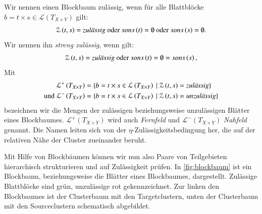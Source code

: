 \begin{defn}
	Wir nennen einen Blockbaum zulässig, wenn für alle Blattblöcke $b = t \times s \in \mathcal{L}\left(T_{X \times Y}\right)$ gilt:
	\begin{equation*}
	  \mathcal{Z}\left(t,s\right) = \text{\textit{zulässig}} \text{ oder }
	  sons\left(t\right) = \emptyset \text{ oder }
	  sons\left(s\right) = \emptyset.
	\end{equation*}      
	Wir nennen ihn \textit{streng zulässig}, wenn gilt:
	\begin{equation*}
	  \mathcal{Z}\left(t,s\right) = \text{\textit{zulässig}} \text{ oder }
	  sons\left(t\right) = \emptyset = sons\left(s\right),
	\end{equation*}
	Mit
	\begin{align*}
		      \mathcal{L}^+\left(T_{X \times Y}\right) &= \{ b = t \times s \in  \mathcal{L}\left(T_{X \times Y}\right) \ | \ \mathcal{Z}\left(t,s\right) = \ttit{zulässig} \}\\
	  \text{und } \mathcal{L}^-\left(T_{X \times Y}\right) &= \{ b = t \times s \in  \mathcal{L}\left(T_{X \times Y}\right) \ | \ \mathcal{Z}\left(t,s\right) = \ttit{unzulässig} \}
	\end{align*}
	bezeichnen wir die Mengen der zulässigen beziehungsweise unzulässigen Blätter eines Blockbaumes. $\mathcal{L}^+\left(T_{X \times Y}\right)$ wird auch \textit{Fernfeld} und 
	$\mathcal{L}^-\left(T_{X \times Y}\right)$ \textit{Nahfeld} genannt. Die Namen leiten sich von der $\eta$-Zulässigkeitsbedingung her, die auf der relativen Nähe der Cluster zueinander beruht.
	
      \end{defn}

      
      Mit Hilfe von Blockbäumen können wir nun also Paare von Teilgebieten hierarchisch strukturieren und auf Zulässigkeit prüfen.
      In \autoref{fig:blockbaum} ist ein Blockbaum, beziehungsweise die Blätter eines Blockbaumes, dargestellt. Zulässige Blattblöcke sind grün, unzulässige rot gekennzeichnet. Zur linken
      den Blockbaumes ist der Clusterbaum mit den Targetclustern, unten der Clusterbaum mit den Sourceclustern schematisch abgebildet.
      
